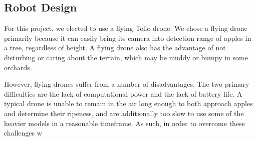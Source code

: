 \subsection{Robot Design}\label{subsec:robot-design}
For this project, we elected to use a flying Tello drone.
We chose a flying drone primarily because it can easily bring its camera into detection range of apples in a tree, regardless of height.
A flying drone also has the advantage of not disturbing or caring about the terrain, which may be muddy or bumpy in some orchards.

However, flying drones suffer from a number of disadvantages.
The two primary difficulties are the lack of computational power and the lack of battery life.
A typical drone is unable to remain in the air long enough to both approach apples and determine their ripeness, and are  additionally too slow to use some of the heavier models in a reasonable timeframe.
As such, in order to overcome these challenges w

